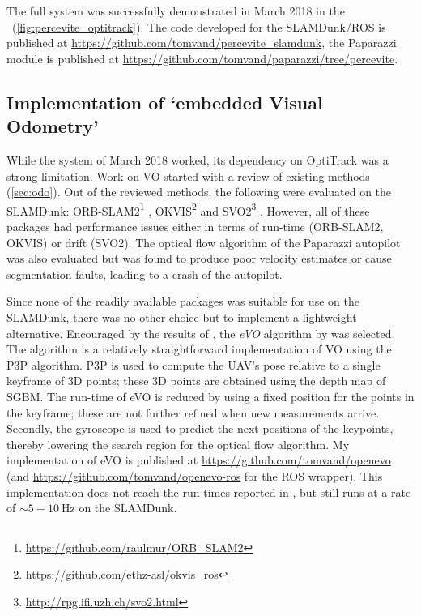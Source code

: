 The full system was successfully demonstrated in March 2018 in the \cyberzoo\ (\autoref{fig:percevite_optitrack}).
The code developed for the SLAMDunk/\acs{ROS} is published at \url{https://github.com/tomvand/percevite_slamdunk}, the Paparazzi module is published at \url{https://github.com/tomvand/paparazzi/tree/percevite}.



\subsection{Implementation of `embedded Visual Odometry'}
While the system of March 2018 worked, its dependency on OptiTrack was a strong limitation.
Work on \ac{VO} started with a review of existing methods (\autoref{sec:odo}).
Out of the reviewed methods, the following were evaluated on the SLAMDunk: ORB-SLAM2\footnote{\url{https://github.com/raulmur/ORB_SLAM2}} \cite{Mur-Artal2017}, OKVIS\footnote{\url{https://github.com/ethz-asl/okvis_ros}} \cite{Leutenegger2015} and SVO2\footnote{\url{http://rpg.ifi.uzh.ch/svo2.html}} \cite{Forster2017}.
However, all of these packages had performance issues either in terms of run-time (ORB-SLAM2, OKVIS) or drift (SVO2).
The optical flow algorithm of the Paparazzi autopilot was also evaluated but was found to produce poor velocity estimates or cause segmentation faults, leading to a crash of the autopilot.

Since none of the readily available packages was suitable for use on the SLAMDunk, there was no other choice but to implement a lightweight alternative.
Encouraged by the results of \cite{Marzat2017}, the \emph{\acf{eVO}} algorithm by \citeauthor{Sanfourche2013} \cite{Sanfourche2013} was selected.
The algorithm is a relatively straightforward implementation of \ac{VO} using the \ac{P3P} algorithm.
\ac{P3P} is used to compute the \ac{UAV}'s pose relative to a single keyframe of 3D points; these 3D points are obtained using the depth map of \acs{SGBM}.
The run-time of \ac{eVO} is reduced by using a fixed position for the points in the keyframe; these are not further refined when new measurements arrive.
Secondly, the gyroscope is used to predict the next positions of the keypoints, thereby lowering the search region for the optical flow algorithm.
My implementation of \ac{eVO} is published at \url{https://github.com/tomvand/openevo} (and \url{https://github.com/tomvand/openevo-ros} for the \ac{ROS} wrapper).
This implementation does not reach the run-times reported in \cite{Sanfourche2013}, but still runs at a rate of $\sim 5-\SI{10}{\Hz}$ on the SLAMDunk.

